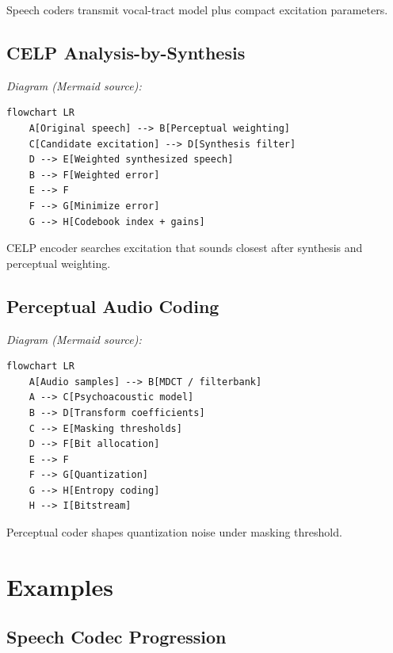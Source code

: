 Speech coders transmit vocal-tract model plus compact excitation parameters.

\subsection{CELP Analysis-by-Synthesis}

\begin{center}\footnotesize\itshape Diagram (Mermaid source):\end{center}
\begin{verbatim}
flowchart LR
    A[Original speech] --> B[Perceptual weighting]
    C[Candidate excitation] --> D[Synthesis filter]
    D --> E[Weighted synthesized speech]
    B --> F[Weighted error]
    E --> F
    F --> G[Minimize error]
    G --> H[Codebook index + gains]
\end{verbatim}

CELP encoder searches excitation that sounds closest after synthesis and perceptual weighting.

\subsection{Perceptual Audio Coding}

\begin{center}\footnotesize\itshape Diagram (Mermaid source):\end{center}
\begin{verbatim}
flowchart LR
    A[Audio samples] --> B[MDCT / filterbank]
    A --> C[Psychoacoustic model]
    B --> D[Transform coefficients]
    C --> E[Masking thresholds]
    D --> F[Bit allocation]
    E --> F
    F --> G[Quantization]
    G --> H[Entropy coding]
    H --> I[Bitstream]
\end{verbatim}

Perceptual coder shapes quantization noise under masking threshold.

\section{Examples}

\subsection{Speech Codec Progression}

\begin{center}
\end{center}

